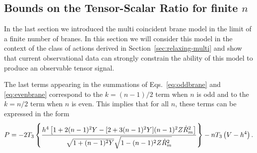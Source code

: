 % 
% 
\subsection{Bounds on the Tensor-Scalar Ratio for finite \texorpdfstring{$n$}{n}} 
\label{sec:multibounds-multi}
In the last section we introduced the multi coincident brane model in the limit
of a finite number of branes. In this section we will consider this model in
the context of the class of actions derived in Section~\ref{sec:relaxing-multi}
and show that current observational data can strongly constrain the ability of
this model to produce an observable tensor signal.

The last terms appearing in the summations of Eqs.~\eqref{eq:oddbrane} 
and \eqref{eq:evenbrane} correspond  to the $k=(n-1)/2$ 
term when $n$ is odd and to the $k=n/2$ term when $n$ is even. This 
implies that for all $n$, these terms can be expressed in the form 
% 
\begin{equation}
\label{eq:unifiedgenP-multi}
P = -2T_3 \left\{ \frac{h^4 \left[ 1+2(n-1)^2Y
- [ 2+3(n-1)^2Y] (n-1)^2Z\dot{R}_m^2  \right]}{\sqrt{1+(n-1)^2Y}
\sqrt{1-(n-1)^2Z\dot{R}_m^2}} 
 \right\} -n T_3 \left( V -h^4 \right).
\end{equation}
% 



